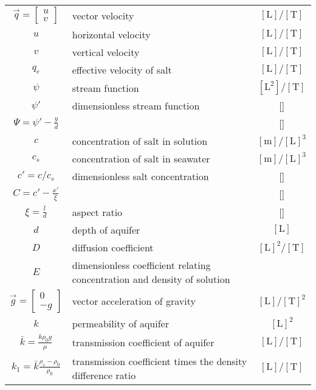 \begin{table}[H]
  \begin{tabular}{cp{200pt}c}
    $\vec{q}=\begin{bmatrix}u \\ v \end{bmatrix}$& vector velocity& $[\text{L}]/[\text{T}]$\\
    $u$& horizontal velocity& $[\text{L}]/[\text{T}]$\\
    $v$& vertical velocity& $[\text{L}]/[\text{T}]$\\
    $q_{e}$& effective velocity of salt& $[\text{L}]/[\text{T}]$\\
    $\psi $& stream function& $[\text{L}^{2}]/[\text{T}]$\\
    $\psi'$& dimensionless stream function & [\hspace{0.5em}]\\
    $\Psi=\psi'-\frac{y}{d}$& & [\hspace{0.5em}]\\
    $c$& concentration of salt in solution& $[\text{m}]/[\text{L}]^3$\\
    $c_s$& concentration of salt in seawater& $[\text{m}]/[\text{L}]^3$\\
    $c'=c/c_s$& dimensionless salt concentration & [\hspace{0.5em}]\\
    $C=c'-\frac{x'}{\xi}$& & [\hspace{0.5em}]\\
    $\xi =\frac{l}{d}$& aspect ratio& [\hspace{0.5em}]\\
    $d$& depth of aquifer& $[\text{L}]$\\
    $D$& diffusion coefficient& $[\text{L}]^2/[\text{T}]$\\
    $E$& dimensionless coefficient relating concentration and density of solution\\
    $\vec{g}=\begin{bmatrix} 0 \\ -g \end{bmatrix}$& vector acceleration of gravity& $[\text{L}]/[\text{T}]^2$\\
    $k$& permeability of aquifer& $[\text{L}]^2$\\
    $\bar{k}=\frac{k \rho_0 g}{\mu}$& transmission coefficient of aquifer& $[\text{L}]/[\text{T}]$\\
    $k_{1} =\bar{k} \frac{\rho_s -\rho_0}{\rho_0}$& transmission coefficient times the density difference ratio& $[\text{L}]/[\text{T}]$\\

\end{tabular}
\end{table}
